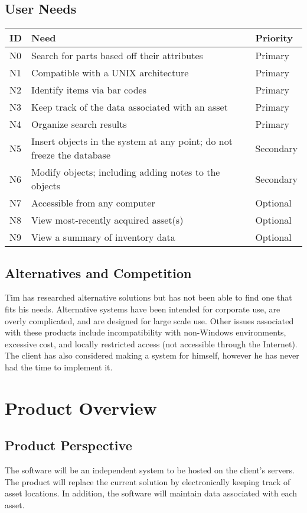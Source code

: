\documentclass{article}
\begin{document}
\subsection{User Needs}
\begin{tabular}{ | p{0.15in} | p{4.0in} | p{.75in} |}
\hline
\textbf{ID} & \textbf{Need} & \textbf{Priority} \\
\hline
\hline
N0 & Search for parts based off their attributes & Primary \\
\hline
N1 & Compatible with a UNIX architecture & Primary \\
\hline
N2 & Identify items via bar codes & Primary \\
\hline
N3 & Keep track of the data associated with an asset & Primary \\
\hline
N4 & Organize search results & Primary \\
\hline
N5 & Insert objects in the system at any point; do not freeze the database & Secondary \\
\hline
N6 & Modify objects; including adding notes to the objects & Secondary \\
\hline
N7 & Accessible from any computer & Optional \\
\hline
N8 & View most-recently acquired asset(s) & Optional \\
\hline
N9 & View a summary of inventory data & Optional \\
\hline
\end{tabular}

\subsection{Alternatives and Competition}
Tim has researched alternative solutions but has not been able to find one that fits his needs.  Alternative systems have been intended for corporate use, are overly complicated, and are designed for large scale use.  Other issues associated with these products include incompatibility with non-Windows environments, excessive cost, and locally restricted access (not accessible through the Internet).  The client has also considered making a system for himself, however he has never had the time to implement it.

\section{Product Overview}

\subsection{Product Perspective}
The software will be an independent system to be hosted on the client's servers.  The product will replace the current solution by electronically keeping track of asset locations. In addition, the software will maintain data associated with each asset.
\end{document}
